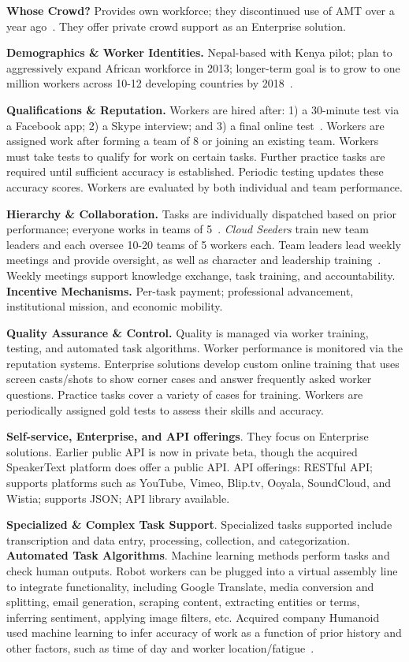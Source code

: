 \documentclass{sigchi}
\begin{document}
{\bf Whose Crowd?} Provides own workforce; they discontinued use of AMT over a year ago~\cite{cf-sears13}. They offer private crowd support as an Enterprise solution.

{\bf Demographics \& Worker Identities.} Nepal-based with Kenya pilot; plan to aggressively expand African workforce in 2013; longer-term goal is to grow to one million workers across 10-12 developing countries by 2018~\cite{Shu-cloudfactory}.

{\bf Qualifications \& Reputation.} Workers are hired after: 1) a 30-minute test via a Facebook app; 2) a Skype interview; and 3) a final online test~\cite{Knight13}. Workers are assigned
work after forming a team of 8 or joining an existing team. Workers must take tests to qualify for work on certain tasks. Further practice tasks are required until sufficient accuracy
is established. Periodic testing updates these accuracy scores. Workers are evaluated by both individual and
team performance. 



{\bf Hierarchy \& Collaboration.} Tasks are individually dispatched 
based on prior performance; everyone works in teams of 5~\cite{cf-sears13}.
{\em Cloud Seeders} train new team leaders and each oversee 10-20 teams of 5 workers each. Team leaders lead weekly meetings and provide oversight, as well as character and leadership training~\cite{Strait12,Sears-quora}. Weekly meetings support knowledge exchange, task training, and accountability. 
{\bf Incentive Mechanisms.} Per-task payment; professional advancement, institutional mission, and economic mobility. 

{\bf Quality Assurance \& Control.} Quality is managed via worker training, testing, and automated task algorithms. Worker performance is monitored via the reputation systems. Enterprise solutions develop custom online training that uses screen casts/shots to show corner
cases and answer frequently asked worker questions. Practice tasks cover a variety of cases for training. Workers are periodically assigned gold tests to assess their skills and accuracy. 


{\bf Self-service, Enterprise, and API offerings}.  They focus on Enterprise solutions. Earlier public API is now in private beta, though the acquired SpeakerText platform does offer a public API. API offerings: RESTful API; supports platforms such as YouTube, Vimeo, Blip.tv, Ooyala, SoundCloud, and Wistia; supports JSON; API library available.

{\bf Specialized \& Complex Task Support}. Specialized tasks supported include transcription and data entry, processing, collection, and categorization. 
{\bf Automated Task Algorithms}. Machine learning methods perform tasks and check human outputs. Robot workers
can be plugged into a virtual assembly line to integrate functionality, including Google Translate, media conversion and splitting, email generation, scraping content, extracting
entities or terms, inferring sentiment, applying image filters, etc. Acquired company Humanoid used machine learning to infer accuracy of work as a function of prior history and other factors, such as time of day and worker location/fatigue~\cite{Humanoid}.
\end{document}
